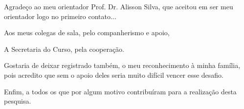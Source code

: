 Agradeço ao meu orientador Prof. Dr. Alisson Silva, que aceitou em ser meu
orientador logo no primeiro contato...

Aos meus colegas de sala, pelo companherismo e apoio, 

A Secretaria do Curso, pela cooperação.

Gostaria de deixar registrado também, o meu reconhecimento à minha família, pois acredito que sem o apoio deles seria muito difícil vencer esse desafio. 

Enfim, a todos os que por algum motivo contribuíram para a realização desta pesquisa.
